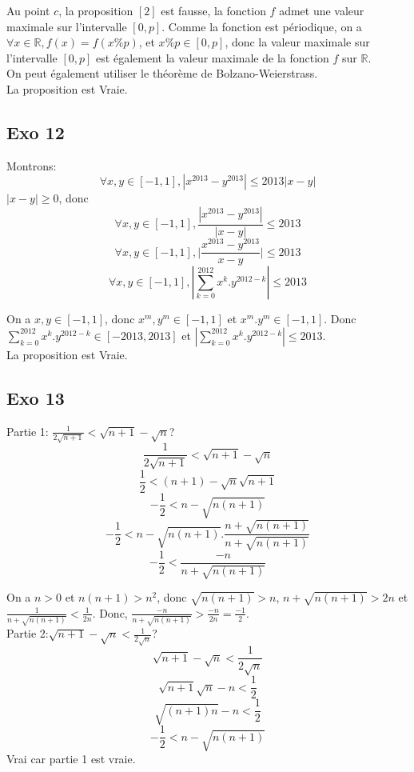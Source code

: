 \documentclass[]{book}
\theoremstyle{definition}
\newcommand{\bb}[1]{\mathbb{#1}}
\newcommand{\R}{\bb{R}}
\begin{document}
Au point $c$, la proposition $[2]$ est fausse, la fonction $f$ admet une valeur maximale sur l'intervalle $[0,p]$. Comme la fonction est p\'eriodique, on a $\forall x \in \R, f(x) = f(x\%p)$, et $x\%p \in [0,p]$, donc la valeur maximale sur l'intervalle $[0,p]$ est \'egalement la valeur maximale de la fonction $f$ sur $\R$. \\


On peut \'egalement utiliser le th\'eor\`eme de Bolzano-Weierstrass.\\

La proposition est Vraie.

\subsection*{Exo 12}
Montrons:
$$\forall x,y \in [-1,1],|x^{2013} - y^{2013}| \le 2013|x-y|$$
$|x-y| \ge 0$, donc
$$\forall x,y \in [-1,1],\frac{|x^{2013} - y^{2013}|}{|x-y|} \le 2013$$
$$\forall x,y \in [-1,1],\Big| \frac{x^{2013} - y^{2013}}{x-y} \Big| \le 2013$$
$$\forall x,y \in [-1,1], |\sum_{k=0}^{2012}x^k.y^{2012-k}| \le 2013$$

On a $x,y \in [-1,1]$, donc $x^m,y^m \in [-1,1]$ et $x^m.y^m \in [-1,1]$. Donc $\sum_{k=0}^{2012}x^k.y^{2012-k} \in [-2013,2013]$ et $|\sum_{k=0}^{2012}x^k.y^{2012-k}| \le 2013$.
\\

La proposition est Vraie.

\subsection*{Exo 13}
Partie 1: $\frac{1}{2\sqrt{n+1}} < \sqrt{n+1}-\sqrt{n}$?\\
$$\frac{1}{2\sqrt{n+1}} < \sqrt{n+1}-\sqrt{n}$$
$$\frac{1}{2} < (n+1)-\sqrt{n}\sqrt{n+1}$$
$$-\frac{1}{2} < n-\sqrt{n(n+1)}$$
$$-\frac{1}{2} < n-\sqrt{n(n+1)}.\frac{n+\sqrt{n(n+1)}}{n+\sqrt{n(n+1)}}$$
$$-\frac{1}{2} < \frac{-n}{n+\sqrt{n(n+1)}}$$

On a $n>0$ et $n(n+1)>n^2$, donc $\sqrt{n(n+1)}>n$, $n+\sqrt{n(n+1)}>2n$ et $\frac{1}{n+\sqrt{n(n+1)}}<\frac{1}{2n}$. Donc, $\frac{-n}{n+\sqrt{n(n+1)}}>\frac{-n}{2n}=\frac{-1}{2}$.\\


Partie 2:$\sqrt{n+1}-\sqrt{n} < \frac{1}{2\sqrt{n}}$?\\
$$\sqrt{n+1}-\sqrt{n} < \frac{1}{2\sqrt{n}}$$
$$\sqrt{n+1}\sqrt{n} -n < \frac{1}{2}$$
$$\sqrt{(n+1)n} -n < \frac{1}{2}$$
$$-\frac{1}{2} < n-\sqrt{n(n+1)}$$
Vrai car partie 1 est vraie.\\
\end{document}
